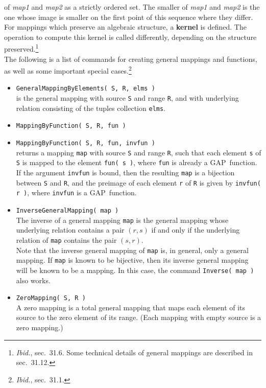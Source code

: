 \documentclass[11pt]{amsart}
\newcommand{\gap}{GAP}   %
\theoremstyle{plain}
\newcommand{\<}{\ensuremath{\langle}}
\renewcommand{\>}{\ensuremath{\rangle}}
\begin{document}
of {\it map1} and {\it map2} as a strictly ordered set. 
The smaller of {\it map1} and {\it map2} is the one 
whose image is smaller on the first point of this sequence where they differ.
\\[5pt]
For mappings which preserve an algebraic structure, a {\bf kernel} is defined. 
The operation to compute this kernel is called differently, depending on the
structure preserved.\footnote{{\it Ibid.}, sec.~31.6.  Some technical
  details of general mappings are described in sec.~31.12.} 
\\[5pt]
The following is a list of commands for creating general mappings and functions, as
well as some important special cases.\footnote{{\it Ibid.}, sec.~31.1.}
\begin{itemize}
\item {\tt GeneralMappingByElements( S, R, elms )}\\
is the general mapping with source {\tt S} and range {\tt R}, and with underlying relation consisting of the tuples
collection {\tt elms}.
\item {\tt MappingByFunction( S, R, fun )}
\item {\tt MappingByFunction( S, R, fun, invfun )}\\
returns a mapping {\tt map} with source {\tt S} and range {\tt R}, such that each element
{\tt s} of {\tt S} is mapped to the element {\tt fun( s )}, where {\tt fun} is
already a \gap\ function.
\\[4pt]
If the argument {\tt invfun} is bound, then the resulting {\tt map} is a bijection
between {\tt S} and {\tt R}, and the preimage of each element {\tt r} of {\tt R} is
given by {\tt invfun( r )}, where {\tt invfun} is a \gap\ function.
\item {\tt InverseGeneralMapping( map )}\\
The inverse of a general mapping {\tt map} is the general mapping whose underlying relation
contains a pair $(r, s)$ if and only if the underlying relation of {\tt map} contains the pair $(s, r)$.
\\[4pt]
Note that the inverse general mapping of {\tt map} is, in general, only a general
mapping. If {\tt map} is known to be bijective, then its inverse general mapping will
be known to be a mapping. In this case, the command {\tt Inverse( map )} also works.
\item  {\tt ZeroMapping( S, R )}\\
A zero mapping is a total general mapping that maps each element of its source to the zero element of its
range. (Each mapping with empty source is a zero mapping.)

\end{itemize}
\end{document}
